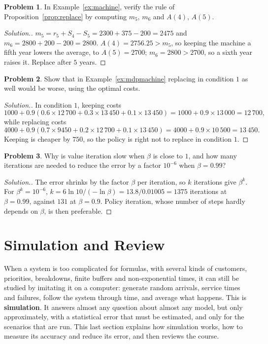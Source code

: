 \documentclass[11pt,a4paper]{article}
\numberwithin{equation}{section}
\theoremstyle{definition}
\newtheorem{problemx}{Problem}[subsection]
\newenvironment{problem}{\begin{problemx}}{\end{problemx}}
\newenvironment{solution}
  {\renewcommand{\qedsymbol}{}\begin{proof}[\textit{Solution}.]}
  {\end{proof}}
\begin{document}
\begin{problem}
In Example~\ref{ex:machine}, verify the rule of Proposition~\ref{prop:replace} by computing $m_5$, $m_6$ and $A(4)$, $A(5)$.
\end{problem}

\begin{solution}
$m_5 = r_5 + S_4 - S_5 = 2300 + 375 - 200 = 2475$ and $m_6 = 2800 + 200 - 200 = 2800$. $A(4) = 2756.25 > m_5$, so keeping the machine a fifth year lowers the average, to $A(5) = 2700$; $m_6 = 2800 > 2700$, so a sixth year raises it. Replace after $5$ years.
\end{solution}

\begin{problem}
Show that in Example~\ref{ex:mdpmachine} replacing in condition $1$ as well would be worse, using the optimal costs.
\end{problem}

\begin{solution}
In condition $1$, keeping costs
\[
1000 + 0.9(0.6 \times 12\,700 + 0.3 \times 13\,450 + 0.1 \times 13\,450) = 1000 + 0.9 \times 13\,000 = 12\,700 ,
\]
while replacing costs
\[
4000 + 0.9(0.7 \times 9450 + 0.2 \times 12\,700 + 0.1 \times 13\,450) = 4000 + 0.9 \times 10\,500 = 13\,450 .
\] Keeping is cheaper by $750$, so the
policy is right not to replace in condition $1$.
\end{solution}

\begin{problem}
Why is value iteration slow when $\beta$ is close to $1$, and how many iterations are needed to reduce the error by a factor $10^{-6}$ when $\beta = 0.99$?
\end{problem}

\begin{solution}
The error shrinks by the factor $\beta$ per iteration, so $k$ iterations give $\beta^k$. For $\beta^k = 10^{-6}$, $k = 6\ln 10/(-\ln\beta) = 13.8/0.01005 = 1375$ iterations at $\beta = 0.99$, against $131$ at $\beta = 0.9$. Policy iteration, whose number of steps hardly depends on $\beta$, is then preferable.
\end{solution}

\section{Simulation and Review}
\label{sec:simulation}

When a system is too complicated for formulas, with several kinds of customers, priorities, breakdowns, finite buffers and non-exponential times, it can still be studied by imitating it on a computer: generate random arrivals, service times and failures, follow the system through time, and average what happens. This is
\textbf{simulation}. It answers almost any question about almost any model, but only approximately, with a statistical error that must be estimated, and only for the scenarios that are run. This last section explains how simulation works, how to measure its accuracy and reduce its error, and then reviews the course.
\end{document}
